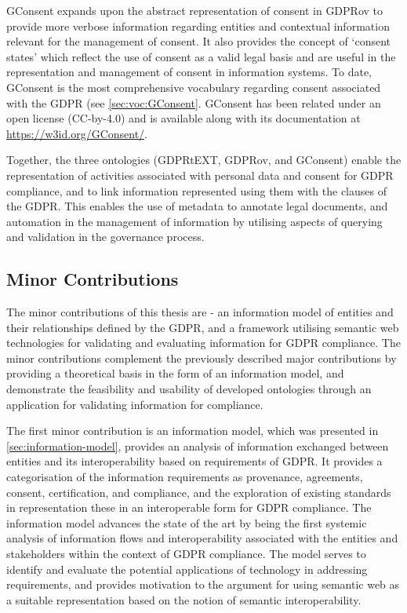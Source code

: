 GConsent expands upon the abstract representation of consent in GDPRov to provide more verbose information regarding entities and contextual information relevant for the management of consent. It also provides the concept of `consent states' which reflect the use of consent as a valid legal basis and are useful in the  representation and management of consent in information systems. To date, GConsent is the most comprehensive vocabulary regarding consent associated with the GDPR (see \autoref{sec:voc:GConsent}.
GConsent has been related under an open license (CC-by-4.0) and is available along with its documentation at \url{https://w3id.org/GConsent/}.

Together, the three ontologies (GDPRtEXT, GDPRov, and GConsent) enable the representation of activities associated with personal data and consent for GDPR compliance, and to link information represented using them with the clauses of the GDPR.
This enables the use of metadata to annotate legal documents, and automation in the management of information by utilising aspects of querying and validation in the governance process.

\subsection*{Minor Contributions}
The minor contributions of this thesis are - an information model of entities and their relationships defined by the GDPR, and a framework utilising semantic web technologies for validating and evaluating information for GDPR compliance. The minor contributions complement the previously described major contributions by providing a theoretical basis in the form of an information model, and demonstrate the feasibility and usability of developed ontologies through an application for validating information for compliance.

The first minor contribution is an information model, which was presented in \autoref{sec:information-model}, provides an analysis of information exchanged between entities and its interoperability based on requirements of GDPR.
It provides a categorisation of the information requirements as provenance, agreements, consent, certification, and compliance, and the exploration of existing standards in representation these in an interoperable form for GDPR compliance.
The information model advances the state of the art by being the first systemic analysis of information flows and interoperability associated with the entities and stakeholders within the context of GDPR compliance.
The model serves to identify and evaluate the potential applications of technology in addressing requirements, and provides motivation to the argument for using semantic web as a suitable representation based on the notion of semantic interoperability.

